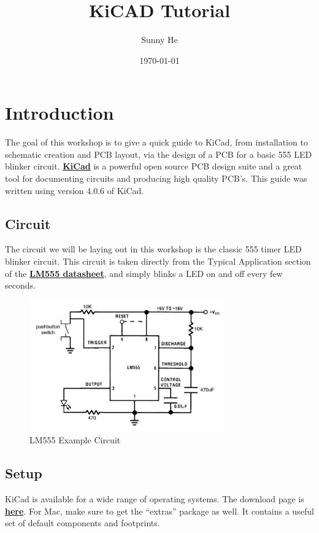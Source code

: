 \documentclass[12pt, oneside]{article}
\title{KiCAD Tutorial}
\date{\today}
\author{Sunny He}
\begin{document}
\maketitle
\section{Introduction}
The goal of this workshop is to give a quick guide to KiCad, from installation to schematic creation and PCB layout, via the design of a PCB for a basic 555 LED blinker circuit. \href{http://kicad-pcb.org/}{\textbf{KiCad}} is a powerful open source PCB design suite and a great tool for documenting circuits and producing high quality PCB's. This guide was written using version 4.0.6 of KiCad.

\subsection{Circuit}
The circuit we will be laying out in this workshop is the classic 555 timer LED blinker circuit. This circuit is taken directly from the Typical Application section of the \href{http://www.ti.com/lit/ds/symlink/lm555.pdf}{\textbf{LM555 datasheet}}, and simply blinks a LED on and off every few seconds.

\begin{figure}[H]
\includegraphics[width=0.75\textwidth]{DatasheetSchematic}
\centering
\caption{LM555 Example Circuit}
\end{figure}

\subsection{Setup}
KiCad is available for a wide range of operating systems. The download page is \href{http://kicad-pcb.org/download/}{\textbf{here}}. For Mac, make sure to get the ``extras'' package as well. It contains a useful set of default components and footprints.
\end{document}
